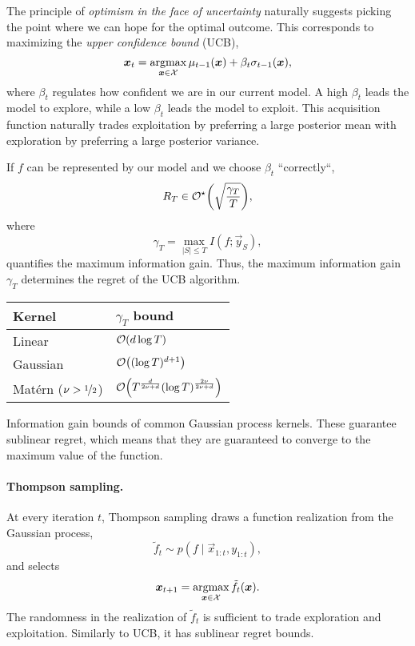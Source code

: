 The principle of \textit{optimism in the face of uncertainty} naturally
suggests picking the point where we can hope for the optimal outcome. This
corresponds to maximizing the \textit{upper confidence bound}
(UCB), \[
  \bm{x}_t = \operatorname*{argmax}_{\bm{x}\in\mathcal{X}} \mu_{t-1}(\bm{x}) + \beta_t \sigma_{t-1}(\bm{x})
,\]
where $\beta_t$ regulates how confident we are in our current model. A high
$\beta_t$ leads the model to explore, while a low $\beta_t$ leads the model
to exploit. This acquisition function naturally trades exploitation by
preferring a large posterior mean with exploration by preferring a large
posterior variance.

If $f$ can be represented by our model and we choose $\beta_t$ ``correctly``, \[
  R_T \in \mathcal{O}^\star \lft( \sqrt{\frac{\gamma_T}{T}} \rgt)
,\]
where \[
  \gamma_T = \max_{|S|\leq T} I(f;\vec{y}_S)
,\]
quantifies the maximum information gain. Thus, the maximum information gain
$\gamma_T$ determines the regret of the UCB algorithm.

\begin{margintable}
  \centering
  \begin{tabular}{ll}
    \toprule
    \textbf{Kernel} & \textbf{$\gamma_T$ bound} \\
    \midrule
    Linear & $\bigo{d\log T}$ \\
    Gaussian & $\bigo{(\log T)^{d+1}}$ \\
    Mat\'ern ($\nu > \nicefrac{1}{2}$) & $\bigo{T^{\frac{d}{2\nu+d}} (\log T)^{\frac{2\nu}{2\nu+d}}}$ \\
    \bottomrule
  \end{tabular}

  \caption{Information gain bounds of common Gaussian process kernels. These
  guarantee sublinear regret, which means that they are guaranteed to converge
  to the maximum value of the function.}
  \label{tab:information-gain-bounds}
\end{margintable}

\paragraph{Thompson sampling.}

At every iteration $t$, Thompson sampling draws a function realization from the
Gaussian process, \[
  \tilde{f}_t \sim p(f\mid \vec{x}_{1:t},y_{1:t})
,\] and selects \[
  \bm{x}_{t+1} = \operatorname*{argmax}_{\bm{x}\in\mathcal{X}} \tilde{f}_t(\bm{x})
.\]
The randomness in the realization of $\tilde{f}_t$ is sufficient to trade
exploration and exploitation. Similarly to UCB, it has sublinear regret bounds.
